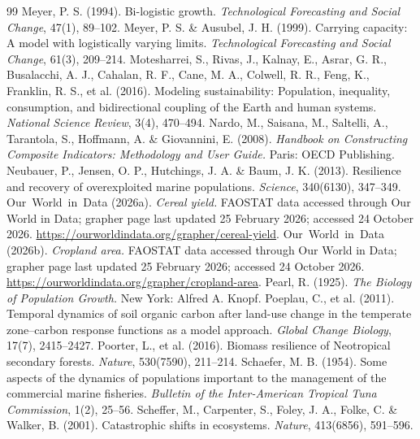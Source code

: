 \documentclass[preprint,12pt,authoryear]{elsarticle}
\begin{document}
\begin{thebibliography}{99}
 Meyer, P. S. (1994). Bi-logistic growth. \emph{Technological Forecasting and Social Change}, 47(1), 89--102.
 Meyer, P. S. \& Ausubel, J. H. (1999). Carrying capacity: A model with logistically varying limits. \emph{Technological Forecasting and Social Change}, 61(3), 209--214.
 Motesharrei, S., Rivas, J., Kalnay, E., Asrar, G. R., Busalacchi, A. J., Cahalan, R. F., Cane, M. A., Colwell, R. R., Feng, K., Franklin, R. S., et al. (2016). Modeling sustainability: Population, inequality, consumption, and bidirectional coupling of the Earth and human systems. \emph{National Science Review}, 3(4), 470--494.
 Nardo, M., Saisana, M., Saltelli, A., Tarantola, S., Hoffmann, A. \& Giovannini, E. (2008). \emph{Handbook on Constructing Composite Indicators: Methodology and User Guide.} Paris: OECD Publishing.
 Neubauer, P., Jensen, O. P., Hutchings, J. A. \& Baum, J. K. (2013). Resilience and recovery of overexploited marine populations. \emph{Science}, 340(6130), 347--349.
 Our~World~in~Data (2026a). \emph{Cereal yield.} FAOSTAT data accessed through Our World in Data; grapher page last updated 25 February 2026; accessed 24 October 2026. \url{https://ourworldindata.org/grapher/cereal-yield}.
 Our~World~in~Data (2026b). \emph{Cropland area.} FAOSTAT data accessed through Our World in Data; grapher page last updated 25 February 2026; accessed 24 October 2026. \url{https://ourworldindata.org/grapher/cropland-area}.
 Pearl, R. (1925). \emph{The Biology of Population Growth.} New York: Alfred A. Knopf.
 Poeplau, C., et al. (2011). Temporal dynamics of soil organic carbon after land-use change in the temperate zone--carbon response functions as a model approach. \emph{Global Change Biology}, 17(7), 2415--2427.
 Poorter, L., et al. (2016). Biomass resilience of Neotropical secondary forests. \emph{Nature}, 530(7590), 211--214.
 Schaefer, M. B. (1954). Some aspects of the dynamics of populations important to the management of the commercial marine fisheries. \emph{Bulletin of the Inter-American Tropical Tuna Commission}, 1(2), 25--56.
 Scheffer, M., Carpenter, S., Foley, J. A., Folke, C. \& Walker, B. (2001). Catastrophic shifts in ecosystems. \emph{Nature}, 413(6856), 591--596.

\end{thebibliography}
\end{document}
